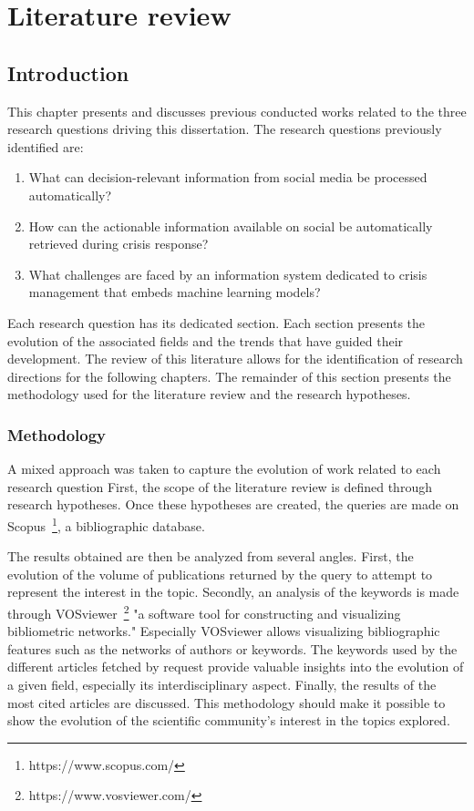 \chapter{Literature review}

\section*{Introduction}
This chapter presents and discusses previous conducted works related to the three research questions driving this dissertation.
The research questions previously identified are:

\begin{enumerate}
    \item What can decision-relevant information from social media be processed automatically?
    \item How can the actionable information available on social be automatically retrieved during crisis response?
    \item What challenges are faced by an information system dedicated to crisis management that embeds machine learning models?
\end{enumerate}

Each research question has its dedicated section.
Each section presents the evolution of the associated fields and the trends that have guided their development.
The review of this literature allows for the identification of research directions for the following chapters.
The remainder of this section presents the methodology used for the literature review and the research hypotheses.

\subsection*{Methodology}
A mixed approach was taken to capture the evolution of work related to each research question
First, the scope of the literature review is defined through research hypotheses.
Once these hypotheses are created, the queries are made on Scopus~\footnote{https://www.scopus.com/}, a bibliographic database.

The results obtained are then be analyzed from several angles.
First, the evolution of the volume of publications returned by the query to attempt to represent the interest in the topic.
Secondly, an analysis of the keywords is made through VOSviewer~\footnote{https://www.vosviewer.com/} "a software tool for constructing and visualizing bibliometric networks."
Especially VOSviewer allows visualizing bibliographic features such as the networks of authors or keywords.
The keywords used by the different articles fetched by request provide valuable insights into the evolution of a given field, especially its interdisciplinary aspect.
Finally, the results of the most cited articles are discussed.
This methodology should make it possible to show the evolution of the scientific community's interest in the topics explored.

